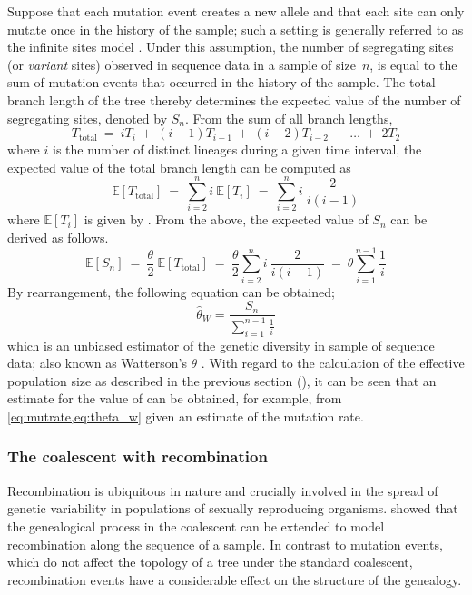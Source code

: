 Suppose that each mutation event creates a new allele and that each site can only mutate once in the history of the sample; such a setting is generally referred to as the infinite sites model \citep{Kimura:1969tn,Watterson:1975ur}.
Under this assumption, the number of segregating sites (or \emph{variant} sites) observed in sequence data in a sample of size~$n$, is equal to the sum of mutation events that occurred in the history of the sample.
The total branch length of the tree thereby determines the expected value of the number of segregating sites, denoted by $S_n$.
From the sum of all branch lengths, \ie
\begin{equation*}
	T_\text{total} ~=~ i T_i ~+~ (i-1) T_{i-1} ~+~ (i-2) T_{i-2} ~+~ \ldots ~+~ 2 T_2
\end{equation*}
where $i$ is the number of distinct lineages during a given time interval,
the expected value of the total branch length can be computed as
\begin{equation}
	\mathbb{E}[T_\text{total}]
	~=~ \sum_{i=2}^{n} i ~ \mathbb{E}[T_i]
	~=~ \sum_{i=2}^{n} i ~ \frac{2}{i(i-1)}
\end{equation}
where ${\mathbb{E}[T_i]}$ is given by .
From the above, the expected value of $S_n$ can be derived as follows.
\begin{equation}
	\mathbb{E}[S_n]
	~=~ \frac{\theta}{2} ~ \mathbb{E}[T_\text{total}]
	~=~ \frac{\theta}{2} \sum_{i=2}^{n} i ~ \frac{2}{i(i-1)}
	~=~ \theta \sum_{i=1}^{n-1} \frac{1}{i}
\end{equation}
By rearrangement, the following equation can be obtained;
\begin{equation}\label{eq:theta_w}
	\hat{\theta}_W = \frac{S_n}{\sum_{i=1}^{n-1} \frac{1}{i}}
\end{equation}
which is an unbiased estimator of the genetic diversity in  sample of sequence data; also known as Watterson's $\theta$ \citep{Watterson:1975ur}.
With regard to the calculation of the effective population size as described in the previous section (), it can be seen that an estimate for the value of \Ne can be obtained, for example, from \cref{eq:mutrate,eq:theta_w} given an estimate of the mutation rate.


%
\subsubsection{The coalescent with recombination}
%

Recombination is ubiquitous in nature and crucially involved in the spread of genetic variability in populations of sexually reproducing organisms.
 showed that the genealogical process in the coalescent can be extended to model recombination along the sequence of a sample.
In contrast to  mutation events, which do not affect the topology of a tree under the standard coalescent, recombination events have a considerable effect on the structure of the genealogy.

